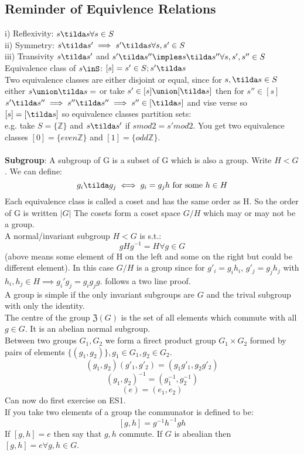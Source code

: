 \documentclass{article}
\begin{document}
{\subsection{Reminder of Equivlence Relations}
i) Reflexivity: $s \tilda s \forall s \in S$\\
ii) Symmetry: $s\tilda s' \implies s' \tilda s \forall s,s' \in S$\\
iii) Transivity $s\tilda s'$ and $s'\tilda s'' \imples s \tilda s'' \forall s, s', s'' \in S$\\
Equivalence class of $s\inS$: $[s] = {s'\in S; s' \tilda s}$\\
Two equivalence classes are either disjoint or equal, since for $s, \tilda s \in S$ either $s \union \tilda s = \empty$ or take $s' \in [s]\union [\tilda s]$ then for $s'' \in [s]$\\
$s' \tilda s'' \implies s'' \tilda s'' \implies s''\in [\tilda s]$ and vise verse so $[s] = [\tilda s ]$ so equivalence classes partition sets:\\
e.g. take $S = \{\mathbb{Z}\}$ and $s \tilda s'$ if $s mod 2 = s' mod 2$. You get two equivalence classes $[0] = \{even \mathbb{Z}\}$ and $[1] = \{odd \mathbb{Z} \}$.\\\\
\textbf{Subgroup}: A subgroup of G is a subset of G which is also a group. Write $H < G$. We can define:
$$
g_i \tilda g_j \iff g_i = g_jh \textrm{ for some } h \in H
$$
Each equivalence class is called a coset and has the same order as H. So the order of G is written $|G|$
The cosets form a coset space $G/H$ which may or may not be a group.\\
A normal/invariant subgroup $H < G$ is s.t.:
$$
gHg^{-1} = H \forall g \in G
$$
(above means some element of H on the left and some on the right but could be different element). In this case $G/H$ is a group since for $g'_i = g_ih_i$, $g'_j = g_jh_j$ with $h_i, h_j \in H \implies g_i' g_j = g_ig_j g$. follows a two line proof.\\
A group is simple if the only invariant subgroups are $G$ and the trival subgroup with only the identity. \\

The centre of the group $\mathfrak{Z}(G)$ is the set of all elements which commute with all $g \in G$. It is an abelian normal subgroup.\\
Between two groups $G_1, G_2$ we form a firect product group $G_1 \times G_2$ formed by pairs of elements $\{(g_1,g_2)\}, g_1 \in G_1, g_2 \in G_2$.
$$
(g_1, g_2)(g'_1, g'_2) = (g_1g'_1,g_2g'_2)
$$
$$
(g_1,g_2)^{-1} = (g_1^{-1}, g_2^{-1})
$$
$$
(e) = (e_1, e_2)
$$
Can now do first exercise on ES1.\\
If you take two elements of a group the communator is defined to be:
$$
[g,h] = g^{-1}h^{-1}gh
$$
If $[g,h] = e$ then say that $g,h$ commute. If $G$ is abealian then $[g,h] = e \forall g,h \in G$.\\
}
\end{document}
